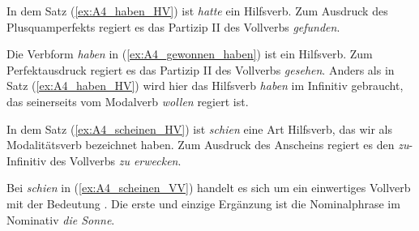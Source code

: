 In dem Satz (\ref{ex:A4_haben_HV}) ist \textit{hatte} ein Hilfsverb. Zum Ausdruck des Plusquamperfekts regiert es das Partizip II des Vollverbs \textit{gefunden}.  

Die Verbform \textit{haben} in (\ref{ex:A4_gewonnen_haben}) ist ein Hilfsverb. Zum Perfektausdruck regiert es das Partizip II des Vollverbs \textit{gesehen}. Anders als in Satz (\ref{ex:A4_haben_HV}) wird hier das Hilfsverb \textit{haben} im Infinitiv gebraucht, das seinerseits vom Modalverb \textit{wollen} regiert ist.

In dem Satz (\ref{ex:A4_scheinen_HV}) ist \textit{schien} eine Art Hilfsverb, das wir als Modalitätsverb bezeichnet haben. Zum Ausdruck des Anscheins regiert es den \textit{zu}-Infinitiv des Vollverbs \textit{zu erwecken}.

Bei \textit{schien} in (\ref{ex:A4_scheinen_VV}) handelt es sich um ein einwertiges Vollverb mit der Bedeutung . Die erste und einzige Ergänzung ist die Nominalphrase im Nominativ \textit{die Sonne}.  



 


